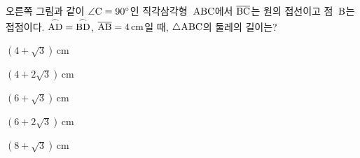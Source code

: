 \noindent\begin{minipage}[t]{0.58\linewidth}\vspace{0pt}\raggedright 오른쪽 그림과 같이 $\angle\mathrm{C}=90^\circ$인 직각삼각형~$\mathrm{ABC}$에서 $\overline{\mathrm{BC}}$는 원의 접선이고 점~$\mathrm{B}$는 접점이다. $\overset{\frown}{\mathrm{AD}}=\overset{\frown}{\mathrm{BD}}$, $\overline{\mathrm{AB}}=4\,\mathrm{cm}$일 때, $\triangle\mathrm{ABC}$의 둘레의 길이는?\end{minipage}\hfill\begin{minipage}[t]{0.4\linewidth}\vspace{0pt}\centering \resizebox{\ifdim\width>\linewidth\linewidth\else\width\fi}{!}{}\end{minipage}\par
\begin{choicesii}{\rule[-3ex]{0pt}{8ex}$(4+\sqrt{3})\,\mathrm{cm}$}{\rule[-3ex]{0pt}{8ex}$(4+2\sqrt{3})\,\mathrm{cm}$}{\rule[-3ex]{0pt}{8ex}$(6+\sqrt{3})\,\mathrm{cm}$}{\rule[-3ex]{0pt}{8ex}$(6+2\sqrt{3})\,\mathrm{cm}$}{\rule[-3ex]{0pt}{8ex}$(8+\sqrt{3})\,\mathrm{cm}$}\end{choicesii}
